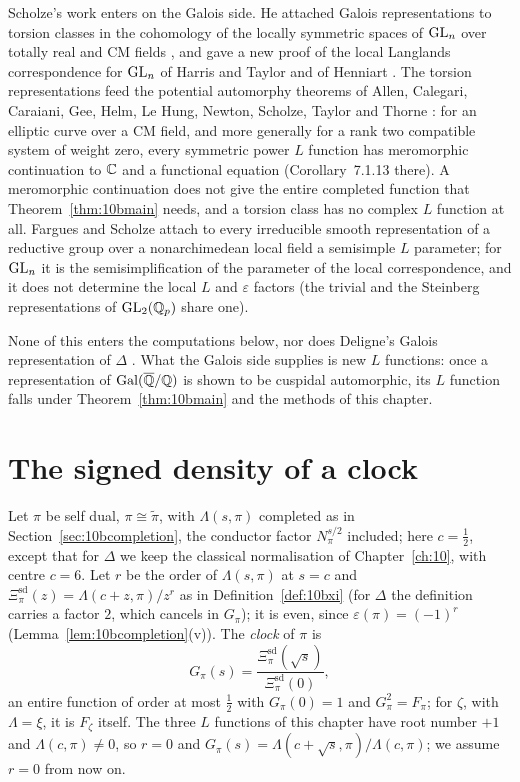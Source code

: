 Scholze's work enters on the Galois side. He attached Galois representations to torsion classes in the cohomology of the locally symmetric spaces of $\mathrm{GL}_n$ over totally real and CM fields \cite{scholze2015}, and gave a new proof \cite{scholze2013} of the local Langlands correspondence for $\mathrm{GL}_n$ of Harris and Taylor and of Henniart \cite{harristaylor2001,henniart2000}. The torsion representations feed the potential automorphy theorems of Allen, Calegari, Caraiani, Gee, Helm, Le Hung, Newton, Scholze, Taylor and Thorne \cite{allen2023}: for an elliptic curve over a CM field, and more generally for a rank two compatible system of weight zero, every symmetric power $L$ function has meromorphic continuation to $\mathbb{C}$ and a functional equation (Corollary~7.1.13 there). A meromorphic continuation does not give the entire completed function that Theorem~\ref{thm:10bmain} needs, and a torsion class has no complex $L$ function at all. Fargues and Scholze \cite{farguesscholze2026} attach to every irreducible smooth representation of a reductive group over a nonarchimedean local field a semisimple $L$ parameter; for $\mathrm{GL}_n$ it is the semisimplification of the parameter of the local correspondence, and it does not determine the local $L$ and $\varepsilon$ factors (the trivial and the Steinberg representations of $\mathrm{GL}_2(\mathbb{Q}_p)$ share one).

None of this enters the computations below, nor does Deligne's Galois representation of $\Delta$ \cite{deligne1971}. What the Galois side supplies is new $L$ functions: once a representation of $\operatorname{Gal}(\overline{\mathbb{Q}}/\mathbb{Q})$ is shown to be cuspidal automorphic, its $L$ function falls under Theorem~\ref{thm:10bmain} and the methods of this chapter.

\section{The signed density of a clock}\label{sec:scholzesigned}

Let $\pi$ be self dual, $\pi\cong\tilde\pi$, with $\Lambda(s,\pi)$ completed as in Section~\ref{sec:10bcompletion}, the conductor factor $N_\pi^{s/2}$ included; here $c=\frac12$, except that for $\Delta$ we keep the classical normalisation of Chapter~\ref{ch:10}, with centre $c=6$. Let $r$ be the order of $\Lambda(s,\pi)$ at $s=c$ and $\Xi^{\mathrm{sd}}_\pi(z)=\Lambda(c+z,\pi)/z^r$ as in Definition~\ref{def:10bxi} (for $\Delta$ the definition carries a factor $2$, which cancels in $G_\pi$); it is even, since $\varepsilon(\pi)=(-1)^r$ (Lemma~\ref{lem:10bcompletion}(v)). The \emph{clock} of $\pi$ is
\[
G_\pi(s)=\frac{\Xi^{\mathrm{sd}}_\pi(\sqrt s)}{\Xi^{\mathrm{sd}}_\pi(0)},
\]
an entire function of order at most $\frac12$ with $G_\pi(0)=1$ and $G_\pi^2=F_\pi$; for $\zeta$, with $\Lambda=\xi$, it is $F_\zeta$ itself. The three $L$ functions of this chapter have root number $+1$ and $\Lambda(c,\pi)\ne0$, so $r=0$ and $G_\pi(s)=\Lambda(c+\sqrt s,\pi)/\Lambda(c,\pi)$; we assume $r=0$ from now on.

